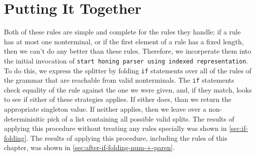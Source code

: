   \section{Putting It Together}
     Both of these rules are simple and complete for the rules they handle; if a rule has at most one nonterminal, or if the first element of a rule has a fixed length, then we can't do any better than these rules.  Therefore, we incorperate them into the initial invocation of \verb|start honing parser using indexed representation|.  To do this, we express the splitter by folding \verb|if| statements over all of the rules of the grammar that are reachable from valid nonterminals.  The \verb|if| statements check equality of the rule against the one we were given, and, if they match, looks to see if either of these strategies applies.  If either does, than we return the appropriate singleton value.  If neither applies, then we leave over a non-determinisitic pick of a list containing all possible valid splits.  The results of applying this procedure without treating any rules specially was shown in \autoref{sec:if-folding}.  The results of applying this procedure, including the rules of this chapter, was shown in \autoref{sec:after-if-folding-num-+-paren}.
     
